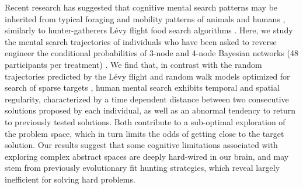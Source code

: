 
Recent research \cite{baronchelli2013levy} has suggested that cognitive mental search patterns \cite{rhodes2007human,radicchi2012rationality,radicchi2012evolution} may be inherited 
from typical foraging and mobility patterns of animals \cite{viswanathan1996levy,ramos2004levy,reynolds2007displaced} and humans \cite{gonzalez2008understanding,song2010modelling,rhee2011levy}, similarly to 
hunter-gatherers L\'evy flight food search algorithms \cite{brown2007levy,raichlen2014evidence}. Here, we study the mental search trajectories of  
individuals who have been asked to reverse engineer the conditional probabilities of 3-node and 4-node Bayesian 
networks (48 participants per treatment) \cite{steyvers2003inferring,pearl2009causality}. We find that, in contrast with the random 
trajectories predicted by the L\'evy flight and random walk models optimized for search of sparse targets \cite{viswanathan1999optimizing,edwards2007revisiting,song2010modelling,viswanathan2011physics}, human mental 
search exhibits temporal and spatial regularity, characterized by a time dependent distance 
between two consecutive solutions proposed by each individual, as well as an abnormal tendency 
to return to previously tested solutions. Both contribute to a sub-optimal exploration of the 
problem space, which in turn limits the odds of getting close to the target solution. Our results 
suggest that some cognitive limitations associated with exploring complex abstract spaces are 
deeply hard-wired in our brain, and may stem from previously evolutionary fit hunting strategies, 
which reveal largely inefficient for solving hard problems.
